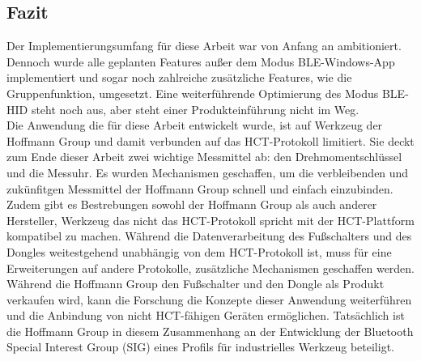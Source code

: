 \subsection{Fazit}
Der Implementierungsumfang für diese Arbeit war von Anfang an ambitioniert. Dennoch wurde alle geplanten Features außer dem Modus \ac{BLE}-Windows-App implementiert und sogar noch zahlreiche zusätzliche Features, wie die Gruppenfunktion, umgesetzt. Eine weiterführende Optimierung des Modus \ac{BLE}-\ac{HID} steht noch aus, aber steht einer Produkteinführung nicht im Weg.\\
Die Anwendung die für diese Arbeit entwickelt wurde, ist auf Werkzeug der Hoffmann Group und damit verbunden auf das HCT-Protokoll limitiert. Sie deckt zum Ende dieser Arbeit zwei wichtige Messmittel ab: den Drehmomentschlüssel und die Messuhr. Es wurden Mechanismen geschaffen, um die verbleibenden und zukünfitgen Messmittel der Hoffmann Group schnell und einfach einzubinden. Zudem gibt es Bestrebungen sowohl der Hoffmann Group als auch anderer Hersteller, Werkzeug das nicht das HCT-Protokoll spricht mit der HCT-Plattform kompatibel zu machen. Während die Datenverarbeitung des Fußschalters und des Dongles weitestgehend unabhängig von dem HCT-Protokoll ist, muss für eine Erweiterungen auf andere Protokolle, zusätzliche Mechanismen geschaffen werden.\\
Während die Hoffmann Group den Fußschalter und den Dongle als Produkt verkaufen wird, kann die Forschung die Konzepte dieser Anwendung weiterführen und die Anbindung von nicht HCT-fähigen Geräten ermöglichen. Tatsächlich ist die Hoffmann Group in diesem Zusammenhang an der Entwicklung der Bluetooth Special Interest Group (SIG) eines Profils für industrielles Werkzeug beteiligt.
